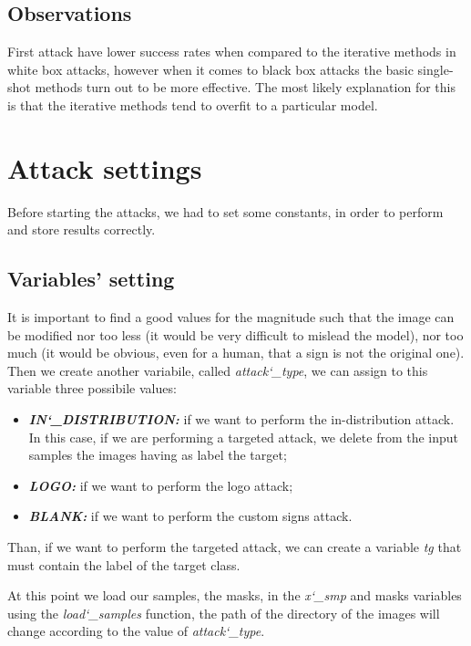 \subsection{Observations}
First attack have lower success rates when compared to the iterative methods in white box attacks, however when it comes to black box attacks the basic single-shot methods turn out to be more effective. The most likely explanation for this is that the iterative methods tend to overfit to a particular model.

\section{Attack settings}
Before starting the attacks, we had to set some constants, in order to perform and store results correctly.

\subsection{Variables' setting}
It is important to find a good values for the magnitude such that the image can be modified nor too less (it would be very difficult to mislead the model), nor too much (it would be obvious, even for a human, that a sign is not the original one).\\
\newline
Then we create another variabile, called \textit{attack\char`_type}, we can assign to this variable three possibile values:
\begin{itemize}
	\item \textbf{\textit{IN\char`_DISTRIBUTION:}} if we want to perform the in-distribution attack. In this case, if we are performing a targeted attack, we delete from the input samples the images having as label the target;
	\item \textbf{\textit{LOGO:}} if we want to perform the logo attack;
	\item \textbf{\textit{BLANK:}} if we want to perform the custom signs attack.
\end{itemize}

Than, if we want to perform the targeted attack, we can create a variable \textit{tg} that must contain the label of the target class.

At this point we load our samples, the masks, in the \textit{x\char`_smp} and masks variables using the \textit{load\char`_samples} function, the path of the directory of the images will change according to the value of \textit{attack\char`_type}.

